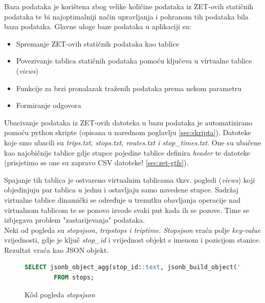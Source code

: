 \documentclass[zavrsnirad]{fer}
\begin{document}
Baza podataka je korištena zbog velike količine podataka iz ZET-ovih statičnih podataka te bi najoptimalniji način upravljanja i pohranom tih podataka bila baza podataka.
Glavne uloge baze podataka u aplikaciji su:
\begin{itemize}
	\item Spremanje ZET-ovih statičnih podataka kao tablice
 	\item Povezivanje tablica statičnih podataka pomoću ključeva u virtualne tablice (\textit{views})
 	\item Funkcije za brzi pronalazak traženih podataka prema nekom parametru
 	\item Formiranje odgovora
\end{itemize}

Ubacivanje podataka iz ZET-ovih datoteka u bazu podataka je automatizirano pomoću python skripte (opisana u narednom poglavlju \ref{sec:skripta}). Datoteke koje smo ubacili su \textit{trips.txt, stops.txt, routes.txt i stop\_times.txt}. One su ubačene kao najobičnije tablice gdje stupce pojedine tablice definira \textit{header} te datoteke (prisjetimo se one su zapravo CSV datoteke! \ref{sec:zet-gtfs}).

Spajanje tih tablica je ostvareno virtualnim tablicama tkzv. pogledi (\textit{views}) koji objedinjuju par tablica u jednu i ostavljaju samo navedene stupce. Sadržaj virtualne tablice dinamički se određuje u trenutku obavljanja operacije nad virtualnom tablicom te se ponovo izvode svaki put kada ih se pozove. Time se izbjegava problem "zastarijevanja" podataka.\\
Neki od pogleda su \textit{stopsjson, tripstops i triptime}.
\textit{Stopsjson} vraća polje \textit{key-value} vrijednosti, gdje je ključ \textit{stop\_id} i vrijednost objekt s imenom i pozicijom stanice. Rezultat vraća kao JSON objekt.
\begin{figure}[h]
	\centering
	\begin{minipage}{0.8\linewidth}
		\begin{lstlisting}[language=SQL]
 		SELECT jsonb_object_agg(stop_id::text, jsonb_build_object('stop_name', stop_name, 'stop_lat', stop_lat, 'stop_lon', stop_lon)) AS stops
		FROM stops;
		\end{lstlisting}
	\end{minipage}
	\caption{K\^od pogleda \textit{stopsjson}}
	\label{slk:stopsjson}
\end{figure}
\\
\end{document}
